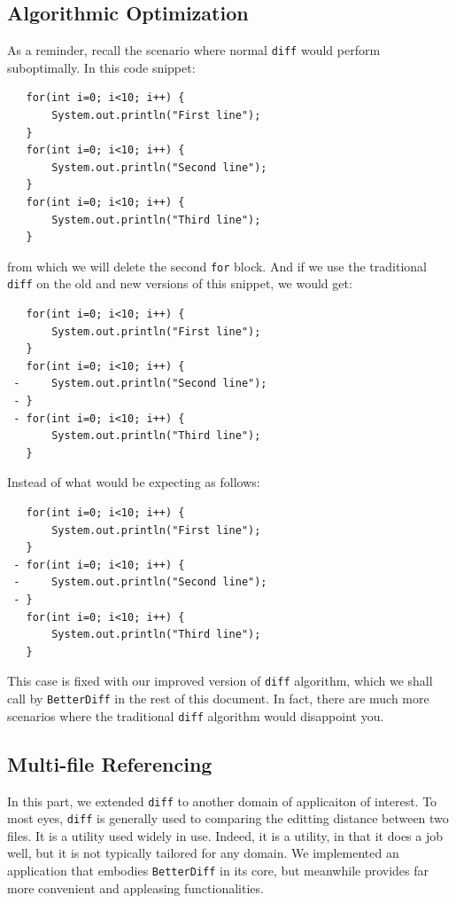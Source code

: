 \documentclass{article}
\begin{document}
\subsection{Algorithmic Optimization}
As a reminder, recall the scenario where normal \texttt{diff} would perform suboptimally. In this code snippet:\\
\begin{lstlisting}
   for(int i=0; i<10; i++) {
       System.out.println("First line");
   }
   for(int i=0; i<10; i++) {
       System.out.println("Second line");
   }
   for(int i=0; i<10; i++) {
       System.out.println("Third line");
   }
\end{lstlisting}
from which we will delete the second \texttt{for} block. And if we use the traditional \texttt{diff} on the old and new versions of this snippet, we would get:\\
\begin{lstlisting}
   for(int i=0; i<10; i++) {
       System.out.println("First line");
   }
   for(int i=0; i<10; i++) {
 -     System.out.println("Second line");
 - }
 - for(int i=0; i<10; i++) {
       System.out.println("Third line");
   }
\end{lstlisting}
Instead of what would be expecting as follows:
\begin{lstlisting}
   for(int i=0; i<10; i++) {
       System.out.println("First line");
   }
 - for(int i=0; i<10; i++) {
 -     System.out.println("Second line");
 - }
   for(int i=0; i<10; i++) {
       System.out.println("Third line");
   }
\end{lstlisting}
This case is fixed with our improved version of \texttt{diff} algorithm, which we shall call by \texttt{BetterDiff} in the rest of this document. In fact, there are much more scenarios where the traditional \texttt{diff} algorithm would disappoint you. \\

\subsection{Multi-file Referencing}
In this part, we extended \texttt{diff} to another domain of applicaiton of interest. To most eyes, \texttt{diff} is generally used to comparing the editting distance between two files. It is a utility used widely in use. Indeed, it is a utility, in that it does a job well, but it is not typically tailored for any domain. We implemented an application that embodies \texttt{BetterDiff} in its core, but meanwhile provides far more convenient and appleasing functionalities. \\
\end{document}

